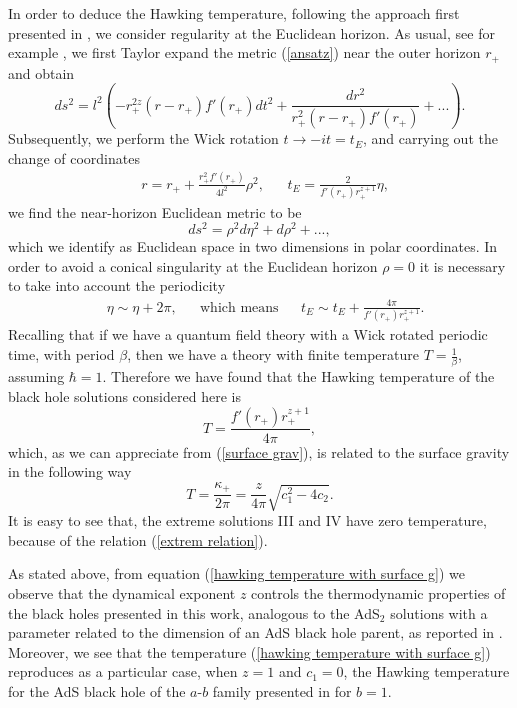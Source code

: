 \documentclass[sn-mathphys,Numbered]{sn-jnl}%
\theoremstyle{thmstyleone}%
\theoremstyle{thmstyletwo}%
\theoremstyle{thmstylethree}%
\begin{document}
In order to deduce the Hawking temperature,  following the approach first presented in \cite{Gibbons}, we consider regularity at the Euclidean horizon. As usual, see for example \cite{Hartnoll4}, we first Taylor expand the metric (\ref{ansatz}) near the outer horizon $r_+$ and obtain
%
 \begin{equation}
        ds^2=l^2\left(-r_{+}^{2z}\left(r-r_+\right)f'(r_+) dt^2+\frac{dr^2}{r_+^2\left(r-r_+\right)f'(r_+)}+...\right).
    \end{equation}
%
Subsequently, we perform the Wick rotation $t \rightarrow -i t=t_E$, and carrying out the change of coordinates
%
\begin{align}\label{rho y eta}
        &r=r_++\frac{r_+^2 f'(r_+)}{4l^2}\rho^2, & &t_E=\frac{2}{f'(r_+)r_+^{z+1}}\eta,
    \end{align}
%
we find the near-horizon Euclidean metric to be
%
 \begin{equation} \label{rindler space}
        ds^2=\rho^2 d\eta^2+d\rho^2+...,
    \end{equation}
%
which we identify as Euclidean space in two dimensions in polar coordinates. In order to avoid a conical singularity at the Euclidean horizon $\rho=0$ it is necessary to take into account the periodicity 
 \begin{align} \label{periodicity}
        &\eta \sim \eta+2\pi, & &\text{which means} & &t_E \sim t_E+\frac{4\pi}{f'(r_+)r_+^{z+1}}.
 \end{align}
 Recalling that if we have a quantum field theory with a Wick rotated periodic time, with period $\beta$, then we have a theory with finite temperature $T=\frac{1}{\beta}$, assuming $\hbar=1$. Therefore we have found that the Hawking temperature of the black hole solutions considered here is
 \begin{equation}\label{hawking temperature}
        T=\frac{f'(r_+)r_+^{z+1}}{4\pi},
    \end{equation}
which, as we can appreciate from  (\ref{surface grav}),  is related to the surface gravity in the following way
%
\begin{equation}\label{hawking temperature with surface g}
        T=\frac{\kappa_+}{2\pi}=\frac{z}{4 \pi}\sqrt{c_1^2-4c_2}.
    \end{equation}
It is easy to see that, the extreme solutions III and IV have zero temperature, because of the relation (\ref{extrem relation}).

As stated above, from equation (\ref{hawking temperature with surface g}) we observe that the dynamical exponent $z$ controls the thermodynamic properties of the black holes presented in this work, analogous to the AdS$_2$ solutions with a parameter related to the dimension of an AdS black hole parent, as reported in \cite{Marika syk}.
Moreover, we see that the temperature (\ref{hawking temperature with surface g}) reproduces as a particular case, when $z=1$ and $c_1=0$, the Hawking temperature for the AdS black hole of the $a$-$b$ family presented in \cite{Grumiller} for $b=1$.
\end{document}
